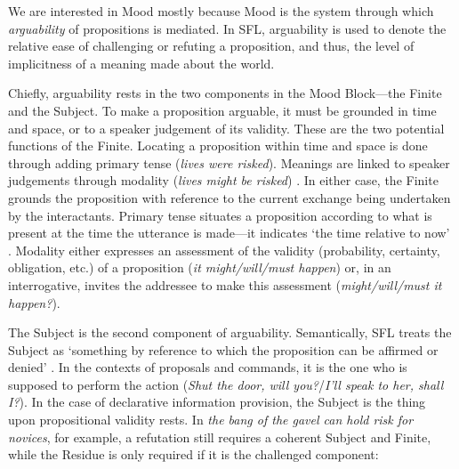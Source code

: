 		We are interested in Mood mostly because Mood is the system through which \emph{arguability} of propositions is mediated. In SFL, arguability is used to denote the relative ease of challenging or refuting a proposition, and thus, the level of implicitness of a meaning made about the world.

		Chiefly, arguability rests in the two components in the Mood Block---the Finite and the Subject. To make a proposition arguable, it must be grounded in time and space, or to a speaker judgement of its validity. These are the two potential functions of the Finite. Locating a proposition within time and space is done through adding primary tense (\emph{lives were risked}). Meanings are linked to speaker judgements through modality (\emph{lives might be risked}) \cite[p.~116]{halliday_introduction_2004}. In either case, the Finite grounds the proposition with reference to the current exchange being undertaken by the interactants. Primary tense situates a proposition according to what is present at the time the utterance is made---it indicates `the time relative to now' \cite[p.~116]{halliday_introduction_2004}. Modality either expresses an assessment of the validity (probability, certainty, obligation, etc.) of a proposition (\emph{it might/will/must happen}) or, in an interrogative, invites the addressee to make this assessment (\emph{might/will/must it happen?}).

		The Subject is the second component of arguability. Semantically, SFL treats the Subject as `something by reference to which the proposition can be affirmed or denied' \cite[p.~117]{halliday_introduction_2004}. In the contexts of proposals and commands, it is the one who is supposed to perform the action (\emph{Shut the door, will you?}/\emph{I'll speak to her, shall I?}). In the case of declarative information provision, the Subject is the thing upon propositional validity rests. In \emph{the bang of the gavel can hold risk for novices}, for example, a refutation still requires a coherent Subject and Finite, while the Residue is only required if it is the challenged component:

